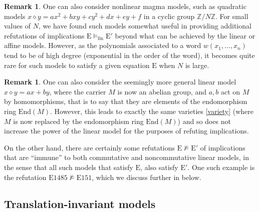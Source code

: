 \documentclass[12pt]{amsart}
\theoremstyle{definition}
\newtheorem{remark}[theorem]{Remark}
\newcommand{\Z}{\mathbb{Z}}
\newcommand{\op}{\diamond}
\newcommand{\nmodels}{\not\models}
\newcommand{\modelsfin}{\models_{\mathrm{fin}}}
\newcommand{\Eq}[1]{\mathrm{E}#1}
\newcommand{\E}{\mathrm{E}}
\begin{document}
\begin{remark}  One can also consider nonlinear magma models, such as quadratic models $x \op y = ax^2 + bxy + cy^2 + dx + ey + f$ in a cyclic group $\Z/N\Z$.  For small values of $N$, we have found such models somewhat useful in providing additional refutations of implications $\E \modelsfin {\E'}$ beyond what can be achieved by the linear or affine models.  However, as the polynomials associated to a word $w(x_1,\dots,x_n)$ tend to be of high degree (exponential in the order of the word), it becomes quite rare for such models to satisfy a given equation $\E$ when $N$ is large.
\end{remark}

\begin{remark} One can also consider the seemingly more general linear model $x \op y = ax + by$, where the carrier $M$ is now an abelian group, and $a,b$ act on $M$ by homomorphisms, that is to say that they are elements of the endomorphism ring $\mathrm{End}(M)$.  However, this leads to exactly the same varieties \eqref{variety} (where $M$ is now replaced by the endomorphism ring $\mathrm{End}(M)$) and so does not increase the power of the linear model for the purposes of refuting implications.
\end{remark}

On the other hand, there are certainly some refutations $\E \nmodels {\E'}$ of implications that are ``immune'' to both commutative and noncommutative linear models, in the sense that all such models that satisfy $\E$, also satisfy ${\E'}$.  One such example is the refutation $\Eq{1485} \not \models \Eq{151}$, which we discuss further in  below.

\subsection{Translation-invariant models}\label{translation-sec}
\end{document}
